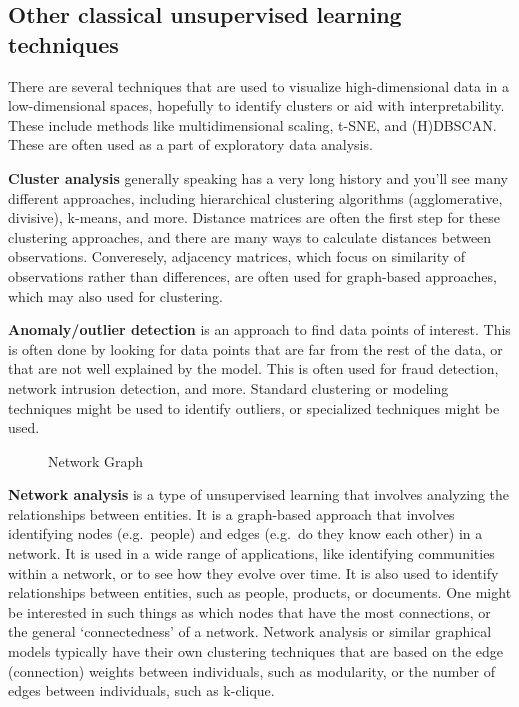 \documentclass[
  letterpaper,
]{krantz}
\begin{document}
\subsection{Other classical unsupervised learning
techniques}\label{other-classical-unsupervised-learning-techniques}

There are several techniques that are used to visualize high-dimensional
data in a low-dimensional spaces, hopefully to identify clusters or aid
with interpretability. These include methods like multidimensional
scaling, t-SNE, and (H)DBSCAN. These are often used as a part of
exploratory data analysis.

\textbf{Cluster analysis} generally speaking has a very long history and
you'll see many different approaches, including hierarchical clustering
algorithms (agglomerative, divisive), k-means, and more. Distance
matrices are often the first step for these clustering approaches, and
there are many ways to calculate distances between observations.
Converesely, adjacency matrices, which focus on similarity of
observations rather than differences, are often used for graph-based
approaches, which may also used for clustering.

\textbf{Anomaly/outlier detection} is an approach to find data points of
interest. This is often done by looking for data points that are far
from the rest of the data, or that are not well explained by the model.
This is often used for fraud detection, network intrusion detection, and
more. Standard clustering or modeling techniques might be used to
identify outliers, or specialized techniques might be used.

\begin{figure}[H]


\caption{\label{fig-network-graph}Network Graph}

\end{figure}%

\textbf{Network analysis} is a type of unsupervised learning that
involves analyzing the relationships between entities. It is a
graph-based approach that involves identifying nodes (e.g.~people) and
edges (e.g.~do they know each other) in a network. It is used in a wide
range of applications, like identifying communities within a network, or
to see how they evolve over time. It is also used to identify
relationships between entities, such as people, products, or documents.
One might be interested in such things as which nodes that have the most
connections, or the general `connectedness' of a network. Network
analysis or similar graphical models typically have their own clustering
techniques that are based on the edge (connection) weights between
individuals, such as modularity, or the number of edges between
individuals, such as k-clique.
\end{document}
